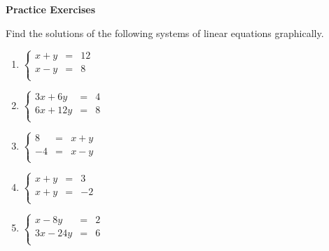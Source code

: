 \textbf{Practice Exercises}

\vspce

Find the solutions of the following systems of linear equations graphically.

\begin{enumerate}[label = \arabic*. ]

\item \hspce $%
\left\{
\begin{array}{ccl}
x+y & = & 12 \\
x-y & = & 8 \\
\end{array}
\right. $
\vspce 
\item \hspce $%
\left\{
\begin{array}{ccl}
3x+6y & = & 4 \\
6x+12y & = & 8 \\
\end{array}
\right. $
\vspce 
\item \hspce $%
\left\{
\begin{array}{ccl}
8 & = & x+y \\
-4 & = & x-y \\
\end{array}
\right. $
\vspce 
\item \hspce $%
\left\{
\begin{array}{ccl}
x+y & = & 3 \\
x+y & = & -2 \\
\end{array}
\right. 
$
\vspce 
\item \hspce $%
\left\{
\begin{array}{ccl}
x-8y & = & 2 \\
3x-24y & = & 6\\
\end{array}
\right. $

\end{enumerate}  
